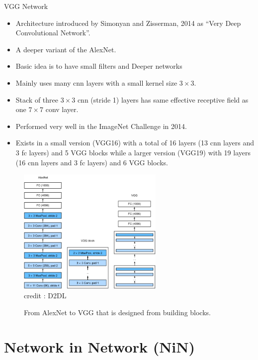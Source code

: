 \begin{vbframe}{VGG Network}
  \begin{itemize}
    \item Architecture introduced by Simonyan and Zisserman, 2014 as \enquote{Very Deep Convolutional Network}.
    \item A deeper variant of the AlexNet.
    \item Basic idea is to have small filters and Deeper networks
    \item Mainly uses many cnn layers with a small kernel size $3 \times 3$.
    \item Stack of three $3 \times 3$ cnn (stride 1) layers has same effective receptive field as one $7 \times 7$ conv layer.
    \item Performed very well in the ImageNet Challenge in 2014.
    \item Exists in a small version (VGG16) with a total of 16 layers (13 cnn layers and 3 fc layers) and 5 VGG blocks while a larger version (VGG19) with 19 layers (16 cnn layers and 3 fc layers) and 6 VGG blocks.
  \end{itemize}
\framebreak
  \begin{figure}
  \centering
    \includegraphics[width=7cm]{plots/moderncnn/vgg.png}
    \tiny{\\ credit : D2DL}
    \caption{From AlexNet to VGG that is designed from building blocks.}
  \end{figure}

\end{vbframe}


\section{Network in Network (NiN)}


